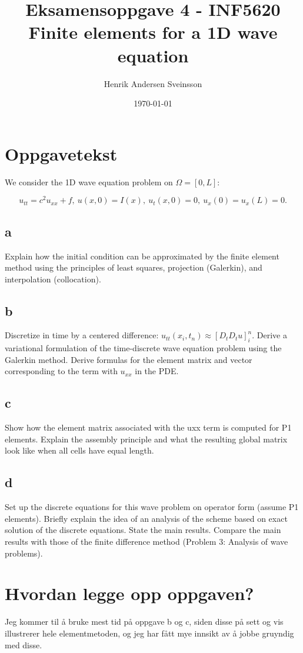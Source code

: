 \documentclass[a4paper, 10pt]{article}
\author{Henrik Andersen Sveinsson}
\title{Eksamensoppgave 4 - INF5620 \\ \large Finite elements for a 1D wave equation }
\date{\today}
\begin{document}
\maketitle

\section{Oppgavetekst}
 We consider the 1D wave equation problem on $\Omega=[0,L]$:

\begin{equation}
	u_{tt}=c^2u_{xx}+f, \ u(x,0)=I(x), \ u_t(x,0)=0, \ u_x(0)=u_x(L)=0.
\end{equation}

\subsection{a}
Explain how the initial condition can be approximated by the finite element method using the principles of least squares, projection (Galerkin), and interpolation (collocation).

\subsection{b} 
Discretize in time by a centered difference: $u_{tt}(x_i,t_n)\approx[D_t D_tu]^n_i$. Derive a variational formulation of the time-discrete wave equation problem using the Galerkin method. Derive formulas for the element matrix and vector corresponding to the term with $u_{xx}$ in the PDE.

\subsection{c} Show how the element matrix associated with the uxx term is computed for P1 elements. Explain the assembly principle and what the resulting global matrix look like when all cells have equal length.

\subsection{d} Set up the discrete equations for this wave problem on operator form (assume P1 elements). Briefly explain the idea of an analysis of the scheme based on exact solution of the discrete equations. State the main results. Compare the main results with those of the finite difference method (Problem 3: Analysis of wave problems). 

\section{Hvordan legge opp oppgaven?}
Jeg kommer til å bruke mest tid på oppgave b og c, siden disse på sett og vis illustrerer hele elementmetoden, og jeg har fått mye innsikt av å jobbe gruyndig med disse. 
\end{document}
